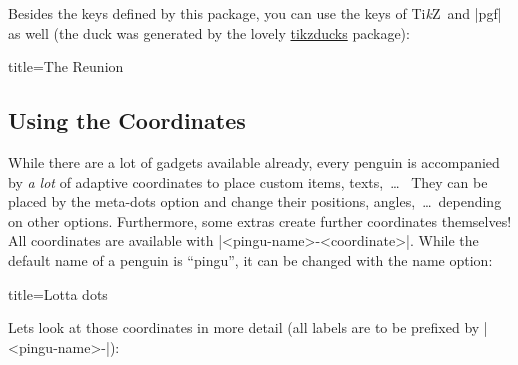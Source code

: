 \documentclass[parskip=half,english,numbers=noenddot,footnotes=nomultiple,oneside]{scrartcl}
\let\say\enquote
\def\TikZ{Ti\textit{k}Z}
\begin{document}
Besides the keys defined by this package, you can use the keys of \TikZ\ and |pgf| as well (the duck was generated by the lovely \href{https://github.com/samcarter/tikzducks}{tikzducks} package):
\begin{tcblisting}{title={The Reunion}}
\begin{tikzpicture}
	\duck
	\pingu[xshift=2.8cm, yshift=14mm,
	       eyes wink]
\end{tikzpicture}
\end{tcblisting}
\subsection{Using the Coordinates}
\label{mrk:coordinates}While there are a lot of gadgets available already,
every penguin is accompanied by \textit{a lot} of adaptive coordinates
to place custom items, texts,~\ldots\ %
They can be placed by the meta-dots option and change their positions, angles,~\ldots\ depending on other options.
Furthermore, some extras create further coordinates themselves!
All coordinates are available with |<pingu-name>-<coordinate>|.
While the default name of a penguin is \say{pingu}, it can be
changed with the name option:
\begin{tcblisting}{title={Lotta dots}}
\end{tcblisting}
Lets look at those coordinates in more detail (all labels are to be prefixed by |<pingu-name>-|):
\newsavebox\pinguwingright
\savebox{}
\makeatletter
\end{document}
